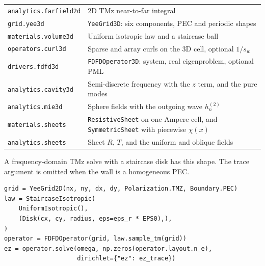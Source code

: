 \documentclass[11pt,a4paper]{article}
\begin{document}
\begin{center}
\begin{tabular}{@{}lp{9.2cm}@{}}
\texttt{analytics.farfield2d}
& 2D TMz near-to-far integral\\
\texttt{grid.yee3d}
& \texttt{YeeGrid3D}: six components, PEC and periodic shapes\\
\texttt{materials.volume3d}
& Uniform isotropic law and a staircase ball\\
\texttt{operators.curl3d}
& Sparse and array curls on the 3D cell, optional $1/s_w$\\
\texttt{drivers.fdfd3d}
& \texttt{FDFDOperator3D}: system, real eigenproblem, optional PML\\
\texttt{analytics.cavity3d}
& Semi-discrete frequency with the $z$ term, and the pure modes\\
\texttt{analytics.mie3d}
& Sphere fields with the outgoing wave $h_n^{(2)}$\\
\texttt{materials.sheets}
& \texttt{ResistiveSheet} on one Ampere cell, and \texttt{SymmetricSheet} with piecewise $\chi(x)$\\
\texttt{analytics.sheets}
& Sheet $R$, $T$, and the uniform and oblique fields\\
\bottomrule
\end{tabular}
\end{center}

A frequency-domain TMz solve with a staircase disk has this shape. The
trace argument is omitted when the wall is a homogeneous PEC.

\begin{verbatim}
grid = YeeGrid2D(nx, ny, dx, dy, Polarization.TMZ, Boundary.PEC)
law = StaircaseIsotropic(
    UniformIsotropic(),
    (Disk(cx, cy, radius, eps=eps_r * EPS0),),
)
operator = FDFDOperator(grid, law.sample_tm(grid))
ez = operator.solve(omega, np.zeros(operator.layout.n_e),
                    dirichlet={"ez": ez_trace})
\end{verbatim}
\end{document}
